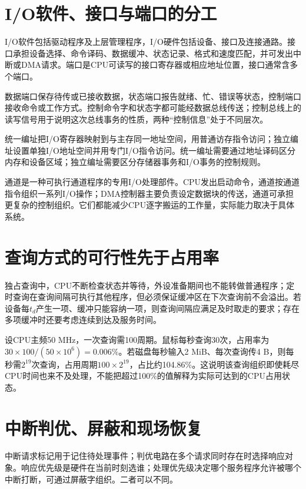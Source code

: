 \section{I/O软件、接口与端口的分工}\label{CO07-io-structure-complete}

I/O软件包括驱动程序及上层管理程序，I/O硬件包括设备、接口及连接通路。接口承担设备选择、命令译码、数据缓冲、状态记录、格式和速度匹配，并可发出中断或DMA请求。端口是CPU可读写的接口寄存器或相应地址位置，接口通常含多个端口。

数据端口保存待传或已接收数据，状态端口报告就绪、忙、错误等状态，控制端口接收命令或工作方式。控制命令字和状态字都可能经数据总线传送；控制总线上的读写信号用于说明这次总线事务的性质，两种``控制信息''处于不同层次。

统一编址把I/O寄存器映射到与主存同一地址空间，用普通访存指令访问；独立编址设置单独I/O地址空间并用专门I/O指令访问。统一编址需要通过地址译码区分内存和设备区域；独立编址需要区分存储器事务和I/O事务的控制规则。

通道是一种可执行通道程序的专用I/O处理部件。CPU发出启动命令，通道按通道指令组织一系列I/O操作；DMA控制器主要负责设定数据块的传送，通道可承担更复杂的控制组织。它们都能减少CPU逐字搬运的工作量，实际能力取决于具体系统。

\section{查询方式的可行性先于占用率}\label{CO07-query-complete}

独占查询中，CPU不断检查状态并等待，外设准备期间也不能转做普通程序；定时查询在查询间隔可执行其他程序，但必须保证缓冲区在下次查询前不会溢出。若设备每\(t_d\)产生一项、缓冲只能容纳一项，则查询间隔应满足及时取走的要求；存在多项缓冲时还要考虑连续到达及服务时间。

设CPU主频50 MHz，一次查询需100周期。鼠标每秒查询30次，占用率为\(30\times100/(50\times10^6)=0.006\%\)。若磁盘每秒输入2 MiB、每次查询传4 B，则每秒需\(2^{19}\)次查询，占用周期\(100\times2^{19}\)，占比约104.86\%。这说明该查询组织即使耗尽CPU时间也来不及处理，不能把超过100\%的值解释为实际可达到的CPU占用状态。

\section{中断判优、屏蔽和现场恢复}\label{CO07-interrupt-complete}

中断请求标记用于记住待处理事件；判优电路在多个请求同时存在时选择响应对象。响应优先级是硬件在当前时刻选谁；处理优先级决定哪个服务程序允许被哪个中断打断，可通过屏蔽字组织。二者可以不同。

